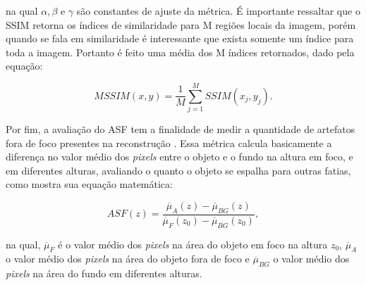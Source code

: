 \noindent na qual $\alpha,\beta \text{ e } \gamma$ são constantes de ajuste da métrica. É importante ressaltar que o \acs{SSIM} retorna os índices de similaridade para M regiões locais da imagem, porém quando se fala em similaridade é interessante que exista somente um índice para toda a imagem. Portanto é feito uma média dos M índices retornados, dado pela equação:

\begin{equation}
MSSIM(x,y) = \dfrac{1}{M} \sum_{j=1}^{M} SSIM(x_{j},y_{j}).
\label{eq:eqCap4MSSIM}
\end{equation} 

Por fim, a avaliação do \acs{ASF} tem a finalidade de medir a quantidade de artefatos fora de foco presentes na reconstrução \cite{zhang2006comparative,borges2017metal}. Essa métrica calcula basicamente a diferença no valor médio dos \textit{pixels} entre o objeto e o fundo na altura em foco, e em diferentes alturas, avaliando o quanto o objeto se espalha para outras fatias, como mostra sua equação matemática:

\begin{equation}
ASF(z) = \dfrac{\overbar{\mu}_{A}(z) - \overbar{\mu}_{BG}(z)}{\overbar{\mu}_{F}(z_{0}) - \overbar{\mu}_{BG}(z_{0})},
\label{eq:eqCap4ASF}
\end{equation} 

\noindent na qual, $\overbar{\mu}_{F}$ é o valor médio dos \textit{pixels} na área do objeto em foco na altura $z_{0}$, $\overbar{\mu}_{A}$ o valor médio dos \textit{pixels} na área do objeto fora de foco e $\overbar{\mu}_{BG}$ o valor médio dos \textit{pixels} na área do fundo em diferentes alturas.

%
%
%
%
%

